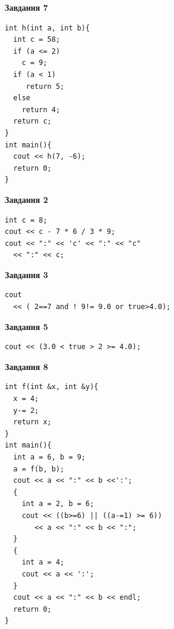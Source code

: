 \documentclass[12pt, ukrainian]{article}
\begin{document}
{\begin {large}
\begin{minipage}[t]{7.0cm}
\begin{center}
\textbf{Завдання 7}
\end{center}
\vspace{-8mm}

\begin{verbatim}
int h(int a, int b){
  int c = 58;
  if (a <= 2)
    c = 9;
  if (a < 1)
     return 5;
  else
    return 4;
  return c;
}
int main(){
  cout << h(7, -6);
  return 0;
}
\end{verbatim}

\end{minipage}
\vline \hspace{1mm}
\begin{minipage}[t]{11.0cm}

\begin{center}
\textbf{Завдання 2}
\end{center}
\vspace{-8mm}

\begin{verbatim}
int c = 8;
cout << c - 7 * 6 / 3 * 9;
cout << ":" << 'c' << ":" << "c" 
  << ":" << c;
\end{verbatim}



\begin{center}
\textbf{Завдання 3}
\end{center}
\vspace{-8mm}

\begin{verbatim}
cout 
  << ( 2==7 and ! 9!= 9.0 or true>4.0);
\end{verbatim}



\begin{center}
\textbf{Завдання 5}
\end{center}
\vspace{-8mm}

\begin{verbatim}
cout << (3.0 < true > 2 >= 4.0);
\end{verbatim}



\begin{center}
\textbf{Завдання 8}
\end{center}
\vspace{-8mm}

\begin{verbatim}
int f(int &x, int &y){
  x = 4;
  y-= 2;
  return x;
}
int main(){
  int a = 6, b = 9;
  a = f(b, b);
  cout << a << ":" << b <<':';
  {
    int a = 2, b = 6;
    cout << ((b>=6) || ((a-=1) >= 6))
       << a << ":" << b << ":";
  }
  {
    int a = 4;
    cout << a << ':';
  }
  cout << a << ":" << b << endl;
  return 0;
}
\end{verbatim}


\end{minipage}
\end{large}}
\end{document}
